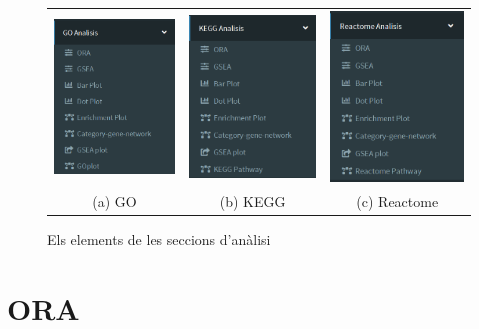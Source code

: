 \begin{figure}[H]
\centering
\begin{tabular}{ccc}
\includegraphics[width=45mm]{figures/App_F2_Items_GO.png} & 
\includegraphics[width=45mm]{figures/App_F3_Items_KEGG.png} &
\includegraphics[width=45mm]{figures/App_F4_Items_RA.png} \\
(a) GO & (b) KEGG & (c) Reactome \\
\end{tabular}
\caption{Els elements de les seccions d'anàlisi}
\end{figure}


\label{sec:ACom}

\section{\gls{ORA}}

